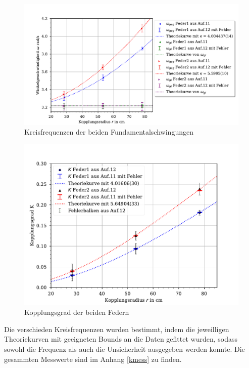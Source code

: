\documentclass[11pt, a4paper]{article}
\begin{document}
    
    \begin{figure}[!h]
        \centering
        \includegraphics[width=\textwidth]{./plotW.pdf}

        \caption{Kreisfrequenzen der beiden Fundamentalschwingungen}
        \label{fig:plotW}
    \end{figure}
    \begin{figure}[!h]
        \centering
        \includegraphics[width=\textwidth]{./Kplot.pdf}

        \caption{Kopplungsgrad der beiden Federn}
        \label{fig:plotK}
    \end{figure}

    Die verschieden Kreisfrequenzen wurden bestimmt, indem die jeweilligen Theoriekurven mit geeigneten
    Bounds an die Daten gefittet wurden, sodass sowohl die Frequenz als auch die Unsicherheit ausgegeben
    werden konnte. Die gesammten Messwerte sind im Anhang \ref{kmess} zu finden.
\end{document}

